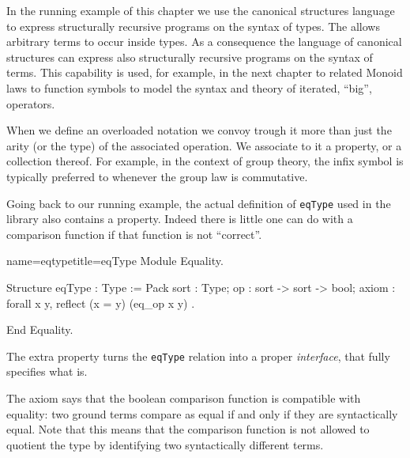 
In the running example of this chapter we use the canonical structures
language to express structurally recursive programs on the syntax
of types.  The \mcbCIC{} allows arbitrary terms to occur inside
types.  As a consequence the language of canonical structures can
express also structurally recursive programs on the syntax
of terms.  This capability is used, for example, in the next
chapter to related Monoid laws to function symbols to model
the syntax and theory of iterated, ``big'', operators.


When we define an overloaded notation we convoy
trough it more than just the arity (or the type) of the associated
operation.  We associate to it a property, or a collection thereof.
For example, in the context of group theory, the infix \C{+} symbol
is typically preferred to \C{*} whenever the group law is
commutative.

Going back to our running example, the actual definition of \lstinline/eqType/
used in the \mcbMC{} library also contains a property.
Indeed there is little one can do with a comparison function if that
function is not ``correct''.  

\begin{coq}{name=eqtype}{title=eqType}
Module Equality.

Structure eqType : Type := Pack {
  sort : Type;
  op : sort -> sort -> bool;
  axiom : forall x y, reflect (x = y) (eq_op x y)
}.

End Equality.
\end{coq}

The extra property turns the
\lstinline/eqType/ relation into a proper \emph{interface},
that fully specifies what  is.

The axiom says that the boolean comparison function
is compatible with equality: two ground terms compare as equal if and
only if they are syntactically equal.  Note that this means that the
comparison function is not allowed to quotient the type by identifying
two syntactically different terms.

